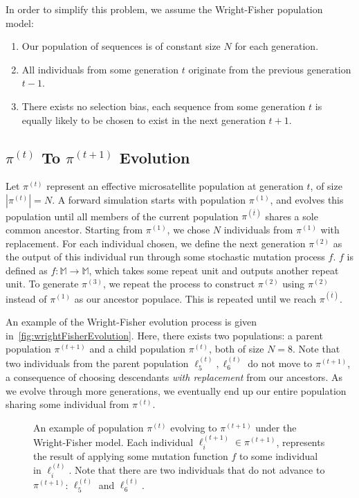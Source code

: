 In order to simplify this problem, we assume the Wright-Fisher population model:
\begin{enumerate}
    \item Our population of sequences is of constant size $N$ for each generation.
    \item All individuals from some generation $t$ originate from the previous generation $t - 1$.
    \item There exists no selection bias, each sequence from some generation $t$ is equally likely to be
        chosen to exist in the next generation $t+1$.
\end{enumerate}

\subsection{$\pi^{(t)}$ To $\pi^{(t+1)}$ Evolution}\label{subsec:piTopiEvolution}
Let $\pi^{(t)}$ represent an effective microsatellite population at generation $t$, of size
$\left|\pi^{(t)} \right| = N$.
A forward simulation starts with population $\pi^{(1)}$, and evolves this population until all members of the current
population $\pi^{(\overbar{t})}$ shares a sole common ancestor.
Starting from $\pi^{(1)}$, we chose $N$ individuals from $\pi^{(1)}$ with replacement.
For each individual chosen, we define the next generation $\pi^{(2)}$ as the output of this individual run through some
stochastic mutation process $f$.
$f$ is defined as $f : \mathbb{M} \rightarrow \mathbb{M}$, which takes some repeat unit and outputs another
repeat unit.
To generate $\pi^{(3)}$, we repeat the process to construct $\pi^{(2)}$ using $\pi^{(2)}$ instead of $\pi^{(1)}$ as
our ancestor populace.
This is repeated until we reach $\pi^{(\overbar{t})}$.

An example of the Wright-Fisher evolution process is given in~\autoref{fig:wrightFisherEvolution}.
Here, there exists two populations: a parent population $\pi^{(t+1)}$ and a child population $\pi^{(t)}$, both of
size $N=8$.
Note that two individuals from the parent population $\ell^{(t)}_5, \ell^{(t)}_6$ do not move to $\pi^{(t+1)}$, a
consequence of choosing descendants \emph{with replacement} from our ancestors.
As we evolve through more generations, we eventually end up our entire population sharing some individual from
$\pi^{(t)}$.

\begin{figure}[t]
    \centering{}
    \caption{An example of population $\pi^{(t)}$ evolving to $\pi^{(t+1)}$ under the Wright-Fisher model.
    Each individual $\ell^{(t+1)}_i \in \pi^{(t+1)}$, represents the result of applying some mutation function $f$ to
    some individual in $\ell^{(t)}_i$.
    Note that there are two individuals that do not advance to $\pi^{(t+1)}$: $\ell^{(t)}_5$ and $\ell^{(t)}_6$.}
    \label{fig:wrightFisherEvolution}
\end{figure}

